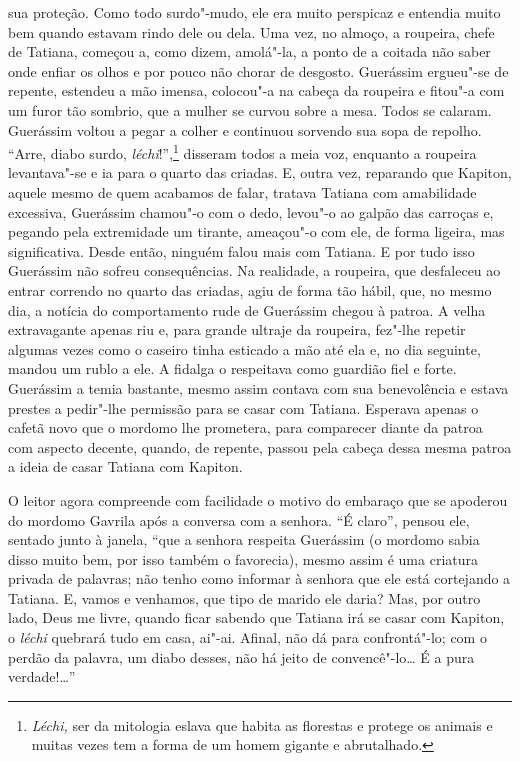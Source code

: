 sua proteção. Como todo surdo"-mudo, ele era muito perspicaz e entendia
muito bem quando estavam rindo dele ou dela. Uma vez, no almoço, a
roupeira, chefe de Tatiana, começou a, como dizem, amolá"-la, a ponto de
a coitada não saber onde enfiar os olhos e por pouco não chorar de
desgosto. Guerássim ergueu"-se de repente, estendeu a mão imensa,
colocou"-a na cabeça da roupeira e fitou"-a com um furor tão sombrio, que
a mulher se curvou sobre a mesa. Todos se calaram. Guerássim voltou a
pegar a colher e continuou sorvendo sua sopa de repolho. ``Arre, diabo
surdo, \emph{léchi}!'',\footnote{\emph{Léchi,} ser da mitologia eslava
  que habita as florestas e protege os animais e muitas vezes tem a
  forma de um homem gigante e abrutalhado.} disseram todos a meia voz,
enquanto a roupeira levantava"-se e ia para o quarto das criadas. E,
outra vez, reparando que Kapiton, aquele mesmo de quem acabamos de
falar, tratava Tatiana com amabilidade excessiva, Guerássim chamou"-o com
o dedo, levou"-o ao galpão das carroças e, pegando pela extremidade um
tirante, ameaçou"-o com ele, de forma ligeira, mas significativa. Desde
então, ninguém falou mais com Tatiana. E por tudo isso Guerássim não
sofreu consequências. Na realidade, a roupeira, que desfaleceu ao entrar
correndo no quarto das criadas, agiu de forma tão hábil, que, no mesmo
dia, a notícia do comportamento rude de Guerássim chegou à patroa. A
velha extravagante apenas riu e, para grande ultraje da roupeira,
fez"-lhe repetir algumas vezes como o caseiro tinha esticado a mão até
ela e, no dia seguinte, mandou um rublo a ele. A fidalga o respeitava
como guardião fiel e forte. Guerássim a temia bastante, mesmo assim
contava com sua benevolência e estava prestes a pedir"-lhe permissão para
se casar com Tatiana. Esperava apenas o cafetã novo que o mordomo lhe
prometera, para comparecer diante da patroa com aspecto decente, quando,
de repente, passou pela cabeça dessa mesma patroa a ideia de casar
Tatiana com Kapiton.

O leitor agora compreende com facilidade o motivo do embaraço que se
apoderou do mordomo Gavrila após a conversa com a senhora. ``É claro'',
pensou ele, sentado junto à janela, ``que a senhora respeita Guerássim
(o mordomo sabia disso muito bem, por isso também o favorecia), mesmo
assim é uma criatura privada de palavras; não tenho como informar à
senhora que ele está cortejando a Tatiana. E, vamos e venhamos, que tipo
de marido ele daria? Mas, por outro lado, Deus me livre, quando ficar
sabendo que Tatiana irá se casar com Kapiton, o \emph{léchi} quebrará
tudo em casa, ai"-ai. Afinal, não dá para confrontá"-lo; com o perdão da
palavra, um diabo desses, não há jeito de convencê"-lo\ldots{} É a pura
verdade!\ldots{}''


